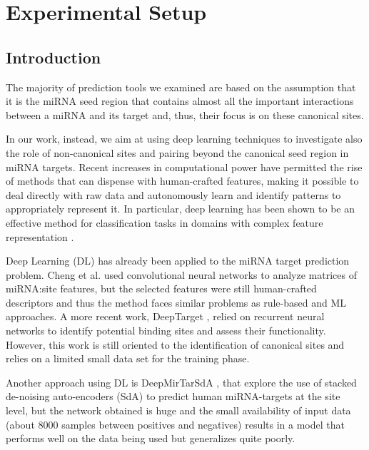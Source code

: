 
\chapter{Experimental Setup} %

\label{Chapter4} %



\section{Introduction}
The majority of prediction tools we examined are based on the assumption that it is the miRNA seed region that contains almost all the important interactions between a miRNA and its target and, thus, their focus is on these canonical sites.

In our work, instead, we aim at using deep learning techniques to investigate also the role of non-canonical sites and pairing beyond the canonical seed region in miRNA targets. Recent increases in computational power have permitted the rise of methods that can dispense with human-crafted features, making it possible to deal directly with raw data and autonomously learn and identify patterns to appropriately represent it. In particular, deep learning has been shown to be an effective method for classification tasks in domains with complex feature representation \cite{dl}.

Deep Learning (DL) has already been applied to the miRNA target prediction problem. Cheng et al. \cite{mirtdl} used convolutional neural networks to analyze matrices of miRNA:site features, but the selected features were still human-crafted descriptors and thus the method faces similar problems as rule-based and ML approaches. A more recent work, DeepTarget \cite{deep_target}, relied on recurrent neural networks to identify potential binding sites and assess their functionality. However, this work is still oriented to the identification of canonical sites and relies on a limited small data set for the training phase. 

Another approach using DL is DeepMirTarSdA \cite{deep_mirtar}, that explore the use of stacked de-noising auto-encoders (SdA) to predict human miRNA-targets at the site level, but the network obtained is huge and the small availability of input data (about 8000 samples between positives and negatives) results in a model that performs well on the data being used but generalizes quite poorly. 

